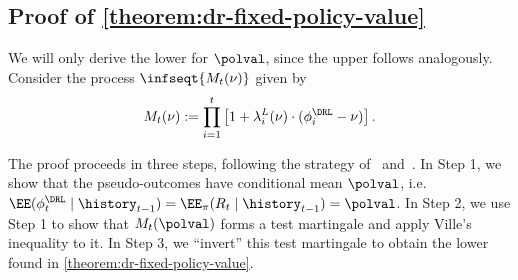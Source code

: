 



\subsection{Proof of \cref{theorem:dr-fixed-policy-value}}\label{proof:dr-fixed-policy-value}

We will only derive the lower \cs{} for $\polval$, since the upper \cs{} follows analogously. Consider the process $\infseqt{M_t(\nu)}$ given by
\begin{equation}\label{eq:label}
  M_t(\nu) :=  \prod_{i=1}^t \left [ 1 + \lambda_i^L(\nu) \cdot (\phi_i^\DRL - \nu) \right ]. 
\end{equation}

The proof proceeds in three steps, following the strategy of~\cite{howard2018uniform,waudby2020estimating} and~\cite{karampatziakis2021off}. 
In Step 1, we show that the pseudo-outcomes have conditional mean $\polval$, i.e. $\EE(\phi_t^\DRL \mid \history_{t-1}) = \EE_\pi (R_t \mid \history_{t-1}) =\polval$. In Step 2, we use Step 1 to show that $M_t(\polval)$ forms a test martingale and apply Ville's inequality to it. In Step 3, we ``invert'' this test martingale to obtain the lower \cs{} found in \cref{theorem:dr-fixed-policy-value}.

